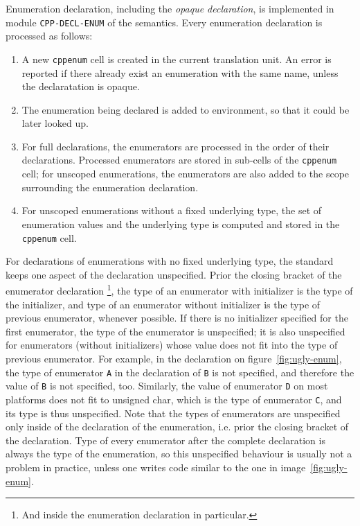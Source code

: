 \documentclass{fithesis3}
\begin{document}
Enumeration declaration, including the \textit{opaque declaration}, is implemented in module \texttt{CPP-DECL-ENUM} of the semantics.
Every enumeration declaration is processed as follows:
\begin{enumerate}
\item A new \texttt{cppenum} cell is created in the current translation unit. An error is reported if there already exist an enumeration with the same name, unless the declaratation is opaque.
\item The enumeration being declared is added to environment, so that it could be later looked up.
\item For full declarations, the enumerators are processed in the order of their declarations. Processed enumerators are stored in sub-cells of the \texttt{cppenum} cell; for unscoped enumerations, the enumerators are also added to the scope surrounding the enumeration declaration.
\item For unscoped enumerations without a fixed underlying type, the set of enumeration values and the underlying type is computed and stored in the \texttt{cppenum} cell.
\end{enumerate}

For declarations of enumerations with no fixed underlying type, the standard keeps one aspect of the declaration unspecified. Prior the closing bracket of the enumerator declaration
\footnote{And inside the enumeration declaration in particular.},
the type of an enumerator with initializer is the type of the initializer, and type of an enumerator without initializer is the type of previous enumerator, whenever possible. If there is no initializer specified for the first enumerator, the type of the enumerator is unspecified; it is also unspecified for enumerators (without initializers) whose value does not fit into the type of previous enumerator. 
For example, in the declaration on figure~\ref{fig:ugly-enum}, the type of enumerator \lstinline{A} in the declaration of \lstinline{B} is not specified, and therefore the value of \lstinline{B} is not specified, too. Similarly, the value of enumerator \lstinline{D} on most platforms does not fit to unsigned char, which is the type of enumerator \lstinline{C}, and its type is thus unspecified. Note that the types of enumerators are unspecified only inside of the declaration of the enumeration, i.e. prior the closing bracket of the declaration. Type of every enumerator after the complete declaration is always the type of the enumeration, so this unspecified behaviour is usually not a problem in practice, unless one writes code similar to the one in image~\ref{fig:ugly-enum}.
\end{document}

